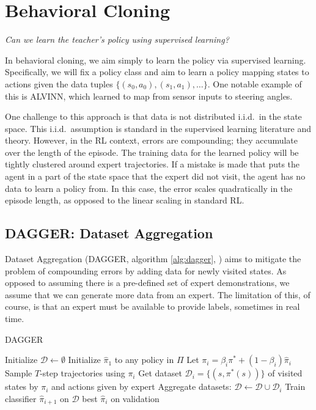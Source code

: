 \documentclass{article}
\begin{document}
\section{Behavioral Cloning}

{\centering \textit{Can we learn the teacher's policy using supervised learning?}\par}

In behavioral cloning, we aim simply to learn the policy via supervised learning. Specifically, we will fix a policy class and aim to learn a policy mapping states to actions given the data tuples $\{(s_0,a_0),(s_1,a_1),\ldots\}$. One notable example of this is ALVINN, which learned to map from sensor inputs to steering angles.



One challenge to this approach is that data is not distributed i.i.d.~in the state space. This i.i.d.~assumption is standard in the supervised learning literature and theory. However, in the RL context, errors are compounding; they accumulate over the length of the episode. The training data for the learned policy will be tightly clustered around expert trajectories. If a mistake is made that puts the agent in a part of the state space that the expert did not visit, the agent has no data to learn a policy from. In this case, the error scales quadratically in the episode length, as opposed to the linear scaling in standard RL.

\subsection{DAGGER: Dataset Aggregation}


Dataset Aggregation (DAGGER, algorithm \ref{alg:dagger}, \cite{ross}) aims to mitigate the problem of compounding errors by adding data for newly visited states. As opposed to assuming there is a pre-defined set of expert demonstrations, we assume that we can generate more data from an expert. The limitation of this, of course, is that an expert must be available to provide labels, sometimes in real time.

\begin{algorithm}
\caption{DAGGER}\label{alg:dagger}
\begin{algorithmic}[1]
\State Initialize $\mathcal{D} \gets \emptyset$
\State Initialize $\hat{\pi}_1$ to any policy in $\Pi$
\State Let $\pi_i = \beta_i \pi^* + (1 - \beta_i) \hat{\pi}_i$
\State Sample $T$-step trajectories using $\pi_i$
\State Get dataset $\mathcal{D}_i = \{(s,\pi^*(s))\}$ of visited states by $\pi_i$ and actions given by expert
\State Aggregate datasets: $\mathcal{D} \gets \mathcal{D} \cup \mathcal{D}_i$
\State Train classifier $\hat{\pi}_{i+1}$ on $\mathcal{D}$
\EndFor
\Return best $\hat{\pi}_{i}$ on validation
\end{algorithmic}
\end{algorithm}
\end{document}
